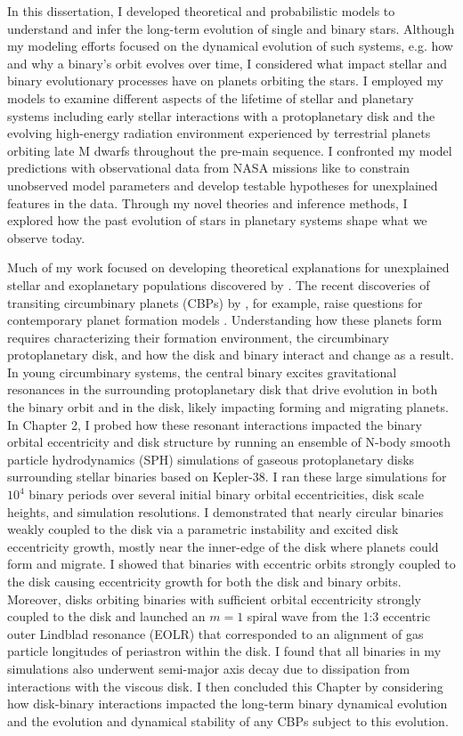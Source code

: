 In this dissertation, I developed theoretical and probabilistic models to understand and infer the long-term evolution of single and binary stars. Although my modeling efforts focused on the dynamical evolution of such systems, e.g. how and why a binary's orbit evolves over time, I considered what impact stellar and binary evolutionary processes have on planets orbiting the stars. I employed my models to examine different aspects of the lifetime of stellar and planetary systems including early stellar interactions with a protoplanetary disk and the evolving high-energy radiation environment experienced by terrestrial planets orbiting late M dwarfs throughout the pre-main sequence. I confronted my model predictions with observational data from NASA missions like \kepler to constrain unobserved model parameters and develop testable hypotheses for unexplained features in the data. Through my novel theories and inference methods, I explored how the past evolution of stars in planetary systems shape what we observe today.

Much of my work focused on developing theoretical explanations for unexplained stellar and exoplanetary populations discovered by \kepler. The recent discoveries of transiting circumbinary planets (CBPs) by \kepler, for example, raise questions for contemporary planet formation models \citep[see][]{Welsh2014}.  Understanding how these planets form requires characterizing their formation environment, the circumbinary protoplanetary disk, and how the disk and binary interact and change as a result.  In young circumbinary systems, the central binary excites gravitational resonances in the surrounding protoplanetary disk that drive evolution in both the binary orbit and in the disk, likely impacting forming and migrating planets.  In Chapter 2, I probed how these resonant interactions impacted the binary orbital eccentricity and disk structure by running an ensemble of N-body smooth particle hydrodynamics (SPH) simulations of gaseous protoplanetary disks surrounding stellar binaries based on Kepler-38. I ran these large simulations for $10^4$ binary periods over several initial binary orbital eccentricities, disk scale heights, and simulation resolutions.  I demonstrated that nearly circular binaries weakly coupled to the disk via a parametric instability and excited disk eccentricity growth, mostly near the inner-edge of the disk where planets could form and migrate.  I showed that binaries with eccentric orbits strongly coupled to the disk causing eccentricity growth for both the disk and binary orbits. Moreover, disks orbiting binaries with sufficient orbital eccentricity strongly coupled to the disk and launched an $m = 1$ spiral wave from the 1:3 eccentric outer Lindblad resonance (EOLR) that corresponded to an alignment of gas particle longitudes of periastron within the disk. I found that all binaries in my simulations also underwent semi-major axis decay due to dissipation from interactions with the viscous disk. I then concluded this Chapter by considering how disk-binary interactions impacted the long-term binary dynamical evolution and the evolution and dynamical stability of any CBPs subject to this evolution. 


